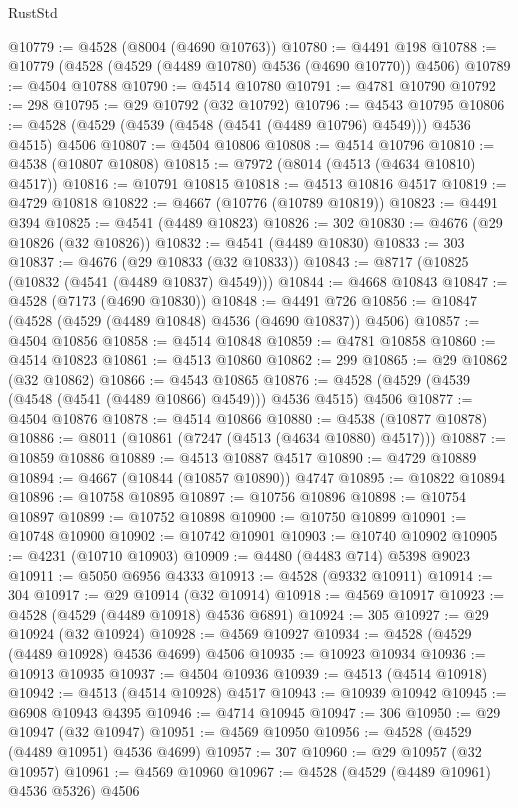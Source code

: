 \begin{lexlean}{RustStd}
\begin{coremodule}
@10779 := @4528 (@8004 (@4690 @10763))
@10780 := @4491 @198
@10788 := @10779 (@4528 (@4529 (@4489 @10780) @4536 (@4690 @10770)) @4506)
@10789 := @4504 @10788
@10790 := @4514 @10780
@10791 := @4781 @10790
@10792 := 298
@10795 := @29 @10792 (@32 @10792)
@10796 := @4543 @10795
@10806 := @4528 (@4529 (@4539 (@4548 (@4541 (@4489 @10796) @4549))) @4536 @4515) @4506
@10807 := @4504 @10806
@10808 := @4514 @10796
@10810 := @4538 (@10807 @10808)
@10815 := @7972 (@8014 (@4513 (@4634 @10810) @4517))
@10816 := @10791 @10815
@10818 := @4513 @10816 @4517
@10819 := @4729 @10818
@10822 := @4667 (@10776 (@10789 @10819))
@10823 := @4491 @394
@10825 := @4541 (@4489 @10823)
@10826 := 302
@10830 := @4676 (@29 @10826 (@32 @10826))
@10832 := @4541 (@4489 @10830)
@10833 := 303
@10837 := @4676 (@29 @10833 (@32 @10833))
@10843 := @8717 (@10825 (@10832 (@4541 (@4489 @10837) @4549)))
@10844 := @4668 @10843
@10847 := @4528 (@7173 (@4690 @10830))
@10848 := @4491 @726
@10856 := @10847 (@4528 (@4529 (@4489 @10848) @4536 (@4690 @10837)) @4506)
@10857 := @4504 @10856
@10858 := @4514 @10848
@10859 := @4781 @10858
@10860 := @4514 @10823
@10861 := @4513 @10860
@10862 := 299
@10865 := @29 @10862 (@32 @10862)
@10866 := @4543 @10865
@10876 := @4528 (@4529 (@4539 (@4548 (@4541 (@4489 @10866) @4549))) @4536 @4515) @4506
@10877 := @4504 @10876
@10878 := @4514 @10866
@10880 := @4538 (@10877 @10878)
@10886 := @8011 (@10861 (@7247 (@4513 (@4634 @10880) @4517)))
@10887 := @10859 @10886
@10889 := @4513 @10887 @4517
@10890 := @4729 @10889
@10894 := @4667 (@10844 (@10857 @10890)) @4747
@10895 := @10822 @10894
@10896 := @10758 @10895
@10897 := @10756 @10896
@10898 := @10754 @10897
@10899 := @10752 @10898
@10900 := @10750 @10899
@10901 := @10748 @10900
@10902 := @10742 @10901
@10903 := @10740 @10902
@10905 := @4231 (@10710 @10903)
@10909 := @4480 (@4483 @714) @5398 @9023
@10911 := @5050 @6956 @4333
@10913 := @4528 (@9332 @10911)
@10914 := 304
@10917 := @29 @10914 (@32 @10914)
@10918 := @4569 @10917
@10923 := @4528 (@4529 (@4489 @10918) @4536 @6891)
@10924 := 305
@10927 := @29 @10924 (@32 @10924)
@10928 := @4569 @10927
@10934 := @4528 (@4529 (@4489 @10928) @4536 @4699) @4506
@10935 := @10923 @10934
@10936 := @10913 @10935
@10937 := @4504 @10936
@10939 := @4513 (@4514 @10918)
@10942 := @4513 (@4514 @10928) @4517
@10943 := @10939 @10942
@10945 := @6908 @10943 @4395
@10946 := @4714 @10945
@10947 := 306
@10950 := @29 @10947 (@32 @10947)
@10951 := @4569 @10950
@10956 := @4528 (@4529 (@4489 @10951) @4536 @4699)
@10957 := 307
@10960 := @29 @10957 (@32 @10957)
@10961 := @4569 @10960
@10967 := @4528 (@4529 (@4489 @10961) @4536 @5326) @4506

\end{coremodule}
\end{lexlean}
